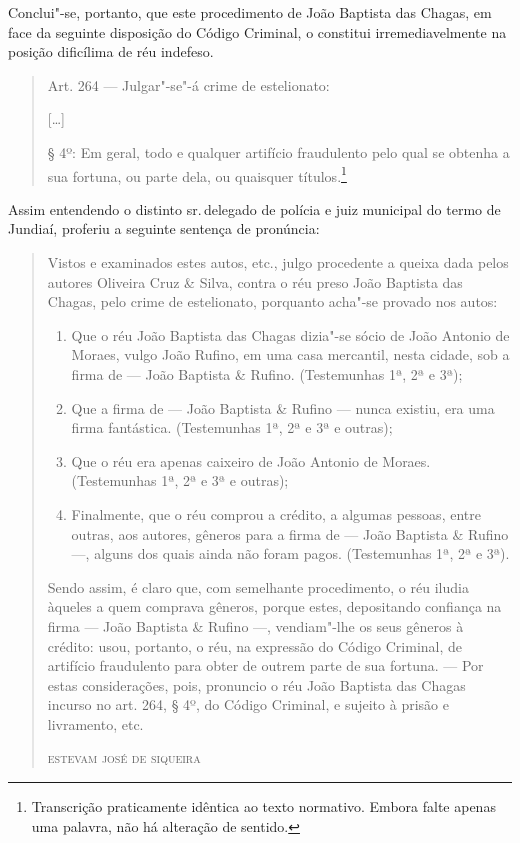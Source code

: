 Conclui"-se, portanto, que este procedimento de João Baptista das Chagas,
em face da seguinte disposição do Código Criminal, o constitui
irremediavelmente na posição dificílima de réu indefeso.

\begin{quote}
Art. 264 --- Julgar"-se"-á crime de estelionato:

{[}\ldots{}{]}

§ 4º: Em geral, todo e qualquer artifício fraudulento pelo qual se
obtenha a sua fortuna, ou parte dela, ou quaisquer títulos.\footnote{Transcrição
  praticamente idêntica ao texto normativo. Embora falte apenas uma
  palavra, não há alteração de sentido.}
\end{quote}

Assim entendendo o distinto sr.\,delegado de polícia e juiz municipal do
termo de Jundiaí, proferiu a seguinte sentença de pronúncia:

\begin{quote}
Vistos e examinados estes autos, etc., julgo procedente a queixa dada
pelos autores Oliveira Cruz \& Silva, contra o réu preso João Baptista
das Chagas, pelo crime de estelionato, porquanto acha"-se provado nos
autos:

\begin{enumerate}[label=\arabic*º]
\item\mbox{} Que o réu João Baptista das Chagas dizia"-se sócio de João Antonio de
Moraes, vulgo João Rufino, em uma casa mercantil, nesta cidade, sob a
firma de --- João Baptista \& Rufino. (Testemunhas 1ª, 2ª e 3ª);

\item\mbox{} Que a firma de --- João Baptista \& Rufino --- nunca existiu, era uma
firma fantástica. (Testemunhas 1ª, 2ª e 3ª e outras);

\item\mbox{} Que o réu era apenas caixeiro de João Antonio de Moraes.
(Testemunhas 1ª, 2ª e 3ª e outras);

\item\mbox{} Finalmente, que o réu comprou a crédito, a algumas pessoas, entre
outras, aos autores, gêneros para a firma de --- João Baptista \&
Rufino ---, alguns dos quais ainda não foram pagos. (Testemunhas 1ª, 2ª
e 3ª).
\end{enumerate}

Sendo assim, é claro que, com semelhante procedimento, o réu iludia
àqueles a quem comprava gêneros, porque estes, depositando confiança na
firma --- João Baptista \& Rufino ---, vendiam"-lhe os seus gêneros à
crédito: usou, portanto, o réu, na expressão do Código Criminal, de
artifício fraudulento para obter de outrem parte de sua fortuna. --- Por
estas considerações, pois, pronuncio o réu João Baptista das Chagas
incurso no art. 264, § 4º, do Código Criminal, e sujeito à prisão e
livramento, etc.

\medskip
\hfill\textsc{estevam josé de siqueira}
\end{quote}



